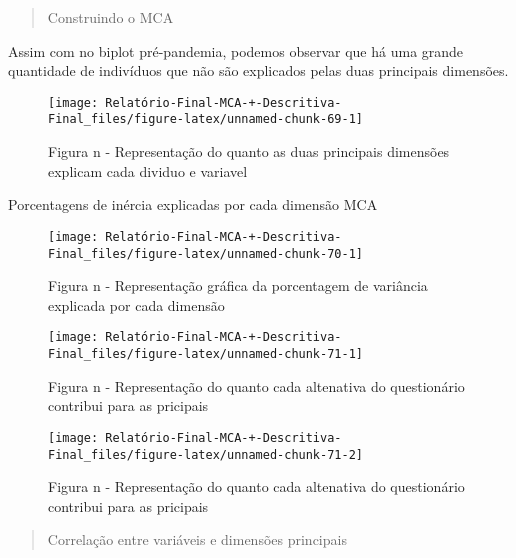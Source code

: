 \documentclass[
]{article}
\begin{document}
\begin{quote}
Construindo o MCA
\end{quote}

Assim com no biplot pré-pandemia, podemos observar que há uma grande
quantidade de indivíduos que não são explicados pelas duas principais
dimensões.

\begin{figure}

{\centering \texttt{[image: Relatório-Final-MCA-+-Descritiva-Final\_files/figure-latex/unnamed-chunk-69-1]} 

}

\caption{Figura n - Representação do quanto as duas principais dimensões explicam cada dividuo e variavel}\label{fig:unnamed-chunk-69}
\end{figure}

Porcentagens de inércia explicadas por cada dimensão MCA

\begin{figure}

{\centering \texttt{[image: Relatório-Final-MCA-+-Descritiva-Final\_files/figure-latex/unnamed-chunk-70-1]} 

}

\caption{Figura n - Representação gráfica da porcentagem de variância explicada por cada dimensão}\label{fig:unnamed-chunk-70}
\end{figure}

\begin{figure}

{\centering \texttt{[image: Relatório-Final-MCA-+-Descritiva-Final\_files/figure-latex/unnamed-chunk-71-1]} 

}

\caption{Figura n - Representação do quanto cada altenativa do questionário contribui para as pricipais}\label{fig:unnamed-chunk-71-1}
\end{figure}
\begin{figure}

{\centering \texttt{[image: Relatório-Final-MCA-+-Descritiva-Final\_files/figure-latex/unnamed-chunk-71-2]} 

}

\caption{Figura n - Representação do quanto cada altenativa do questionário contribui para as pricipais}\label{fig:unnamed-chunk-71-2}
\end{figure}

\begin{quote}
Correlação entre variáveis e dimensões principais
\end{quote}
\end{document}
